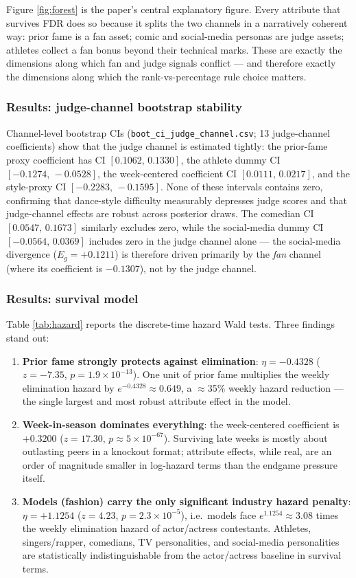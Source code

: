 Figure \ref{fig:forest} is the paper's central explanatory figure. Every attribute that
survives FDR does so because it splits the two channels in a narratively coherent way:
prior fame is a fan asset; comic and social-media personas are judge assets; athletes
collect a fan bonus beyond their technical marks. These are exactly the dimensions along
which fan and judge signals conflict --- and therefore exactly the dimensions along
which the rank-vs-percentage rule choice matters.

\subsubsection{Results: judge-channel bootstrap stability}

Channel-level bootstrap CIs (\texttt{boot\_ci\_judge\_channel.csv}; 13 judge-channel
coefficients) show that the judge channel is estimated tightly: the prior-fame proxy
coefficient has CI $[0.1062,\,0.1330]$, the athlete dummy CI $[-0.1274,\,-0.0528]$, the
week-centered coefficient CI $[0.0111,\,0.0217]$, and the style-proxy CI
$[-0.2283,\,-0.1595]$. None of these intervals contains zero, confirming that
dance-style difficulty measurably depresses judge scores and that judge-channel effects
are robust across posterior draws. The comedian CI $[0.0547,\,0.1673]$ similarly
excludes zero, while the social-media dummy CI $[-0.0564,\,0.0369]$ includes zero in the
judge channel alone --- the social-media divergence ($E_g = +0.1211$) is therefore
driven primarily by the \emph{fan} channel (where its coefficient is $-0.1307$), not by
the judge channel.

\subsubsection{Results: survival model}

Table \ref{tab:hazard} reports the discrete-time hazard Wald tests. Three findings
stand out:
\begin{enumerate}
\item \textbf{Prior fame strongly protects against elimination}: $\eta = -0.4328$
($z = -7.35$, $p = 1.9\times10^{-13}$). One unit of prior fame multiplies the weekly
elimination hazard by $e^{-0.4328} \approx 0.649$, a $\approx$35\% weekly hazard
reduction --- the single largest and most robust attribute effect in the model.
\item \textbf{Week-in-season dominates everything}: the week-centered coefficient is
$+0.3200$ ($z = 17.30$, $p \approx 5\times10^{-67}$). Surviving late weeks is mostly
about outlasting peers in a knockout format; attribute effects, while real, are an
order of magnitude smaller in log-hazard terms than the endgame pressure itself.
\item \textbf{Models (fashion) carry the only significant industry hazard penalty}:
$\eta = +1.1254$ ($z = 4.23$, $p = 2.3\times10^{-5}$), i.e.\ models face
$e^{1.1254} \approx 3.08$ times the weekly elimination hazard of actor/actress
contestants. Athletes, singers/rapper, comedians, TV personalities, and social-media
personalities are statistically indistinguishable from the actor/actress baseline in
survival terms.
\end{enumerate}

